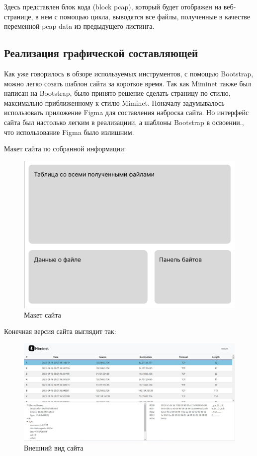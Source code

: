 Здесь представлен блок кода (block pcap), 
который будет отображен на веб-странице, 
в нем с помощью цикла, выводятся все файлы, полученные в качестве переменной 
pcap data из предыдущего листинга.


\subsection{Реализация графической составляющей} 
Как уже говорилось в обзоре используемых инструментов, с помощью Bootstrap, можно легко созать шаблон сайта за короткое время.
Так как Miminet также был написан на Bootstrap, было принято решение сделать страницу по стилю, максимально приближенному к стилю Miminet.
Поначалу задумывалось использовать приложение Figma для составления наброска сайта.
Но интерфейс сайта был настолько легким в реализациии, а шаблоны Bootstrap в освоении., что использование Figma было излишним.



Макет сайта по собранной информации:
\begin{figure}[!ht]
  \begin{center}
  \includegraphics[scale=0.6]{layout.png}\caption{Макет сайта}\label{figure1}
  \end{center}
\end{figure}


\newpage
Конечная версия сайта выглядит так:
\begin{figure}[!ht]
  \begin{center}
  \includegraphics[scale=0.4]{cite.jpg}\caption{Внешний вид сайта}\label{figure2}
  \end{center}
\end{figure}


